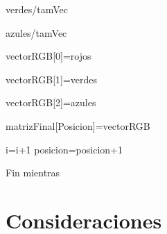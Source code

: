 \documentclass{article}
\begin{document}
\hspace{0.5cm}verdes/tamVec

\hspace{0.5cm}azules/tamVec

\hspace{0.5cm}vectorRGB[0]=rojos

\hspace{0.5cm}vectorRGB[1]=verdes

\hspace{0.5cm}vectorRGB[2]=azules

\hspace{0.5cm}matrizFinal[Posicion]=vectorRGB

\hspace{0.5cm}i=i+1
\hspace{0.5cm}posicion=posicion+1

Fin mientras

\section{Consideraciones}\label{Consideraciones}
\end{document}
